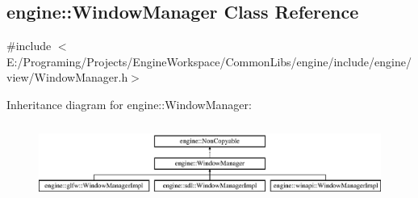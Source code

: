 \hypertarget{a00087}{}\subsection{engine\+:\+:Window\+Manager Class Reference}
\label{a00087}


{\ttfamily \#include $<$E\+:/\+Programing/\+Projects/\+Engine\+Workspace/\+Common\+Libs/engine/include/engine/view/\+Window\+Manager.\+h$>$}

Inheritance diagram for engine\+:\+:Window\+Manager\+:\begin{figure}[H]
\begin{center}
\leavevmode
\includegraphics[height=2.511211cm]{a00087}
\end{center}
\end{figure}
